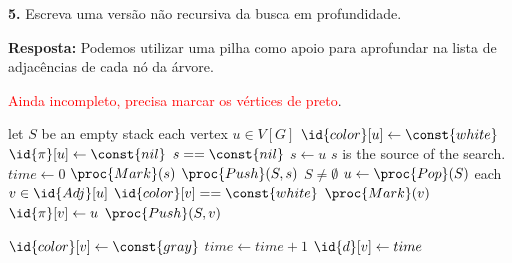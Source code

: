 
\noindent\textbf{5.} Escreva uma versão não recursiva da busca em profundidade.

\textbf{Resposta:} Podemos utilizar uma pilha como apoio para aprofundar na lista de adjacências de cada nó da árvore.

\textcolor{red}{Ainda incompleto, precisa marcar os vértices de preto}.

\begin{codebox}
\li \Comment let $S$ be an empty stack
\li \For each vertex $u \in V[G]$
\li \Do
        $\id{color}[u] \gets \const{white}$
\li     $\id{\pi}[u] \gets \const{nil}$
\li     \If $s == \const{nil}$
\li     \Then
            $s \gets u$ \Comment $s$ is the source of the search.
        \End
    \End
\li $time \gets 0$
\li $\proc{Mark}(s)$
\li $\proc{Push}(S, s)$
\li \While $S \neq \emptyset$
\li \Do
        $u \gets \proc{Pop}(S)$
\li     \For each $v \in \id{Adj}[u]$
\li     \Do
            \If $\id{color}[v] == \const{white}$
\li         \Then
                $\proc{Mark}(v)$
\li             $\id{\pi}[v] \gets u$
\li             $\proc{Push}(S, v)$
\li         \End
        \End
    \End
\end{codebox}

\begin{codebox}
\li $\id{color}[v] \gets \const{gray}$
\li $time \gets time + 1$
\li $\id{d}[v] \gets time$
\end{codebox}